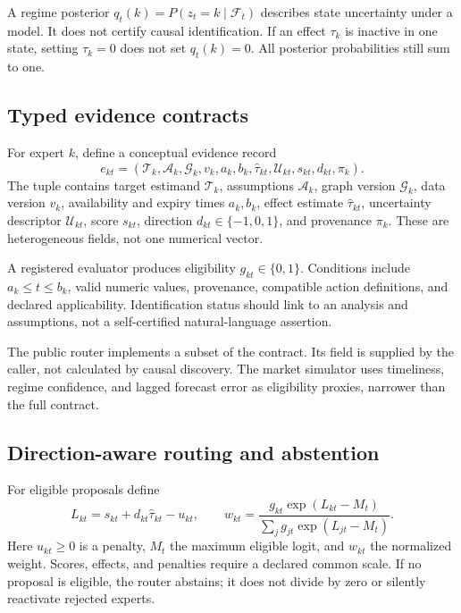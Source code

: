 A regime posterior $q_t(k)=P(z_t=k\mid\mathcal F_t)$ describes state uncertainty under a model. It does not certify causal identification. If an effect $\tau_k$ is inactive in one state, setting $\tau_k=0$ does not set $q_t(k)=0$. All posterior probabilities still sum to one.

\subsection{Typed evidence contracts}
For expert $k$, define a conceptual evidence record
\[
e_{kt}=(\mathcal T_k,\mathcal A_k,\mathcal G_k,v_k,a_k,b_k,
\widehat\tau_{kt},\mathcal U_{kt},s_{kt},d_{kt},\pi_k).
\]
The tuple contains target estimand $\mathcal T_k$, assumptions $\mathcal A_k$, graph version $\mathcal G_k$, data version $v_k$, availability and expiry times $a_k,b_k$, effect estimate $\widehat\tau_{kt}$, uncertainty descriptor $\mathcal U_{kt}$, score $s_{kt}$, direction $d_{kt}\in\{-1,0,1\}$, and provenance $\pi_k$. These are heterogeneous fields, not one numerical vector.

A registered evaluator produces eligibility $g_{kt}\in\{0,1\}$. Conditions include $a_k\le t\le b_k$, valid numeric values, provenance, compatible action definitions, and declared applicability. Identification status should link to an analysis and assumptions, not a self-certified natural-language assertion.


The public router implements a subset of the contract. Its  field is supplied by the caller, not calculated by causal discovery. The market simulator uses timeliness, regime confidence, and lagged forecast error as eligibility proxies, narrower than the full contract.

\subsection{Direction-aware routing and abstention}
For eligible proposals define
\begin{equation}
L_{kt}=s_{kt}+d_{kt}\widehat\tau_{kt}-u_{kt},\qquad
w_{kt}=\frac{g_{kt}\exp(L_{kt}-M_t)}{\sum_j g_{jt}\exp(L_{jt}-M_t)}.
\label{eq:router}
\end{equation}
Here $u_{kt}\ge0$ is a penalty, $M_t$ the maximum eligible logit, and $w_{kt}$ the normalized weight. Scores, effects, and penalties require a declared common scale. If no proposal is eligible, the router abstains; it does not divide by zero or silently reactivate rejected experts.

